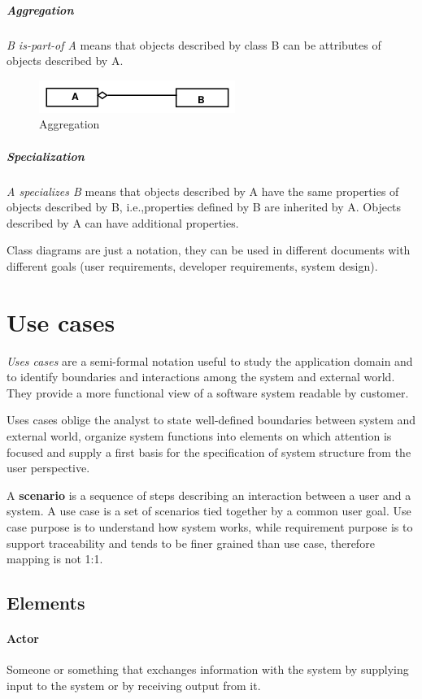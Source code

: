 \subparagraph{Aggregation}
\emph{B is-part-of A} means that objects described by class B can be attributes of objects described by A.

\begin{figure}[hbtp]
\centering
\includegraphics[scale=0.4]{images/uml_aggregation.png}
\caption{Aggregation}
\end{figure}

\subparagraph{Specialization}
\emph{A specializes B} means that objects described by A have the same properties of objects described by B, i.e.,\@ properties defined by B are inherited by A. Objects described by A can have additional properties. 

\medskip
Class diagrams are just a notation, they can be used in different documents with different goals (user requirements, developer requirements, system design).

\section{Use cases}
\emph{Uses cases} are a semi-formal notation useful to study the application domain and to identify boundaries and interactions among the system and external world. They provide a more functional view of a software system readable by customer.

Uses cases oblige the analyst to state well-defined boundaries between system and external world, organize system functions into elements on which attention is focused and supply a first basis for the specification of system structure from the user perspective.

A \textbf{scenario} is a sequence of steps describing an interaction between a user and a system. A use case is a set of scenarios tied together by a common user goal. Use case purpose is to understand how system works, while requirement purpose is to support traceability and tends to be finer grained than use case, therefore mapping is not 1:1.

\subsection{Elements}
\paragraph{Actor}
Someone or something that exchanges information with the system by supplying input to the system or by receiving output from it.

